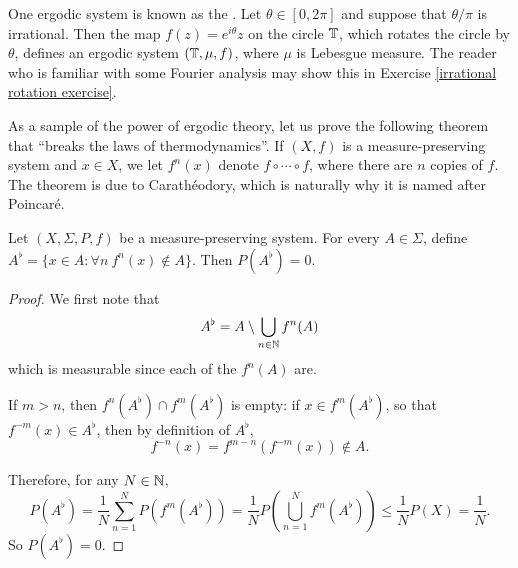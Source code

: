 \begin{example}
One ergodic system is known as the .
Let $\theta \in [0, 2\pi]$ and suppose that $\theta/\pi$ is irrational.
Then the map $f(z) = e^{i\theta}z$ on the circle $\mathbb{T}$, which rotates the circle by $\theta$, defines an ergodic system $(\mathbb{T}, \mu, f)$, where $\mu$ is Lebesgue measure.
The reader who is familiar with some Fourier analysis may show this in Exercise \ref{irrational rotation exercise}.
\end{example}

\begin{subsec}
As a sample of the power of ergodic theory, let us prove the following theorem that ``breaks the laws of thermodynamics''.
If $(X, f)$ is a measure-preserving system and $x \in X$, we let $f^n(x)$ denote $f \circ \cdots \circ f$, where there are $n$ copies of $f$.
The theorem is due to Carathéodory, which is naturally why it is named after Poincar\'e.
\end{subsec}

\begin{theorem}
Let $(X, \Sigma, P, f)$ be a measure-preserving system.
For every $A \in \Sigma$, define $A^{\flat} = \{x \in A: \forall n~f^n(x) \notin A\}$.
Then $P(A^\flat) = 0$.
\end{theorem}
\begin{proof}
We first note that
\[A^{\flat} = A \setminus \bigcup_{n \in \mathbb{N}} f^n(A)\]
which is measurable since each of the $f^n(A)$ are.

If $m > n$, then $f^n(A^\flat) \cap f^m(A^\flat)$ is empty: if $x \in f^m(A^\flat)$, so that $f^{-m}(x) \in A^\flat$, then by definition of $A^\flat$,
\[f^{-n}(x) = f^{m-n}(f^{-m}(x)) \notin A.\]

Therefore, for any $N \in \mathbb{N}$,
\[P(A^\flat) = \frac{1}{N} \sum_{n=1}^{N} P(f^m(A^\flat)) = \frac{1}{N} P\left(\bigcup_{n=1}^{N} f^m(A^\flat)\right) \leq \frac{1}{N} P(X) = \frac{1}{N}.\]
So $P(A^\flat) = 0$.
\end{proof}

